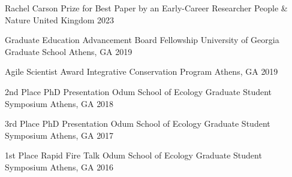 



\begin{cvhonors}
    \cvhonor
    {Rachel Carson Prize for Best Paper by an Early-Career Researcher}
    {People \& Nature}
    {United Kingdom}
    {2023}

  \cvhonor
    {Graduate Education Advancement Board Fellowship}
    {University of Georgia Graduate School}
    {Athens, GA}
    {2019}

  \cvhonor
    {Agile Scientist Award}
    {Integrative Conservation Program}
    {Athens, GA}
    {2019}

  \cvhonor
    {2nd Place PhD Presentation}
    {Odum School of Ecology Graduate Student Symposium}
    {Athens, GA}
    {2018}

  \cvhonor
    {3rd Place PhD Presentation}
    {Odum School of Ecology Graduate Student Symposium}
    {Athens, GA}
    {2017}

  \cvhonor
    {1st Place Rapid Fire Talk} %
    {Odum School of Ecology Graduate Student Symposium} %
    {Athens, GA} %
    {2016} %

\end{cvhonors}

\medskip

